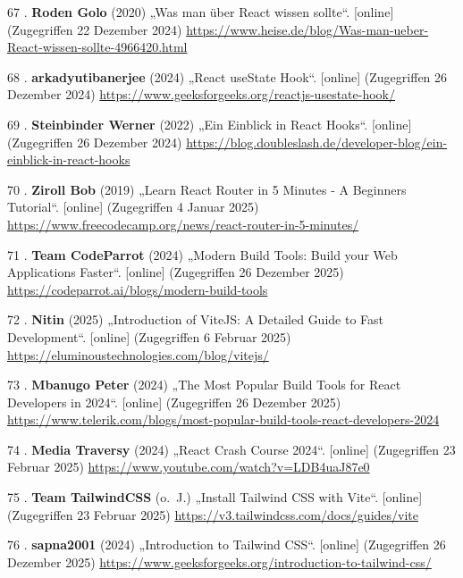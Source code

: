 \documentclass[
    headings=optiontotocandhead,%
    twoside,
    numbers=noenddot,%
    12pt, %
    titlepage, %
    parskip=full, %
    listof=leveldown, 
    numbers=noenddot, %
    a4paper,DIV=14,
    BCOR=15mm,
]{scrbook}
\newlength{\cslhangindent}
\newenvironment{cslreferences}%
  {\setlength{\parindent}{0pt}%
  \everypar{\setlength{\hangindent}{\cslhangindent}}\ignorespaces}%
  {\par}
\begin{document}
\begin{cslreferences}
\leavevmode\hypertarget{ref-Heise-React}{}%
67 . \textbf{Roden Golo} (2020) „Was man über React wissen sollte``.
{[}online{]} (Zugegriffen 22 Dezember 2024)
\url{https://www.heise.de/blog/Was-man-ueber-React-wissen-sollte-4966420.html}

\leavevmode\hypertarget{ref-GeeksForGeeks-useState}{}%
68 . \textbf{arkadyutibanerjee} (2024) „React useState Hook``.
{[}online{]} (Zugegriffen 26 Dezember 2024)
\url{https://www.geeksforgeeks.org/reactjs-usestate-hook/}

\leavevmode\hypertarget{ref-DoubleSlash-ReactHooks}{}%
69 . \textbf{Steinbinder Werner} (2022) „Ein Einblick in React Hooks``.
{[}online{]} (Zugegriffen 26 Dezember 2024)
\url{https://blog.doubleslash.de/developer-blog/ein-einblick-in-react-hooks}

\leavevmode\hypertarget{ref-FreeCodeCamp-Routing}{}%
70 . \textbf{Ziroll Bob} (2019) „Learn React Router in 5 Minutes - A
Beginners Tutorial``. {[}online{]} (Zugegriffen 4 Januar 2025)
\url{https://www.freecodecamp.org/news/react-router-in-5-minutes/}

\leavevmode\hypertarget{ref-CodeParrot-BuildTools}{}%
71 . \textbf{Team CodeParrot} (2024) „Modern Build Tools: Build your Web
Applications Faster``. {[}online{]} (Zugegriffen 26 Dezember 2025)
\url{https://codeparrot.ai/blogs/modern-build-tools}

\leavevmode\hypertarget{ref-eluminoustechnologies-vite}{}%
72 . \textbf{Nitin} (2025) „Introduction of ViteJS: A Detailed Guide to
Fast Development``. {[}online{]} (Zugegriffen 6 Februar 2025)
\url{https://eluminoustechnologies.com/blog/vitejs/}

\leavevmode\hypertarget{ref-Telerik-BuildTools}{}%
73 . \textbf{Mbanugo Peter} (2024) „The Most Popular Build Tools for
React Developers in 2024``. {[}online{]} (Zugegriffen 26 Dezember 2025)
\url{https://www.telerik.com/blogs/most-popular-build-tools-react-developers-2024}

\leavevmode\hypertarget{ref-React-CrashCourse}{}%
74 . \textbf{Media Traversy} (2024) „React Crash Course 2024``.
{[}online{]} (Zugegriffen 23 Februar 2025)
\url{https://www.youtube.com/watch?v=LDB4uaJ87e0}

\leavevmode\hypertarget{ref-TailwindCSS-Docs-ViteSetup}{}%
75 . \textbf{Team TailwindCSS} (o.~J.) „Install Tailwind CSS with
Vite``. {[}online{]} (Zugegriffen 23 Februar 2025)
\url{https://v3.tailwindcss.com/docs/guides/vite}

\leavevmode\hypertarget{ref-GeeksForGeeks-TailwindCSS}{}%
76 . \textbf{sapna2001} (2024) „Introduction to Tailwind CSS``.
{[}online{]} (Zugegriffen 26 Dezember 2025)
\url{https://www.geeksforgeeks.org/introduction-to-tailwind-css/}


\end{cslreferences}
\end{document}

